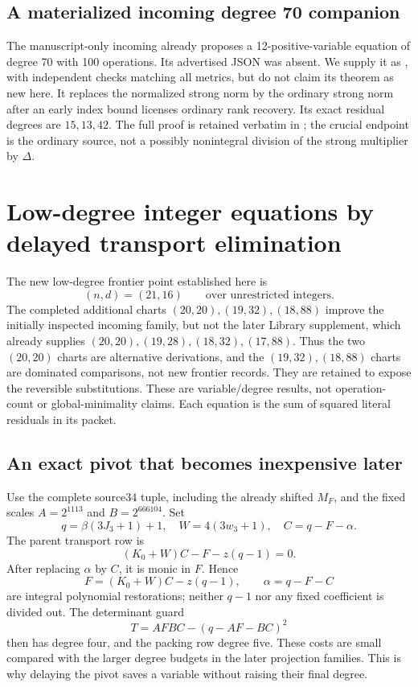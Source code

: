 \documentclass[11pt]{article}
\begin{document}
\subsection{A materialized incoming degree 70 companion}
The manuscript-only incoming  already proposes a
12-positive-variable equation of degree 70 with 100 operations.  Its advertised
JSON was absent.  We supply it as
, with independent checks matching
all metrics, but do not claim its theorem as new here.  It replaces the
normalized strong norm by the ordinary strong norm after an early index
bound licenses ordinary rank recovery.  Its exact residual degrees are
$15,13,42$.  The full proof is retained verbatim in
; the crucial endpoint
is the ordinary source, not a possibly nonintegral division of the strong
multiplier by $\Delta$.


\section{Low-degree integer equations by delayed transport elimination}
The new low-degree frontier point established here is
\[
 (n,d)=(21,16)\qquad\text{over unrestricted integers}.
\]
The completed additional charts $(20,20),(19,32),(18,88)$ improve the
initially inspected incoming family, but not the later Library supplement,
which already supplies $(20,20),(19,28),(18,32),(17,88)$.
Thus the two $(20,20)$ charts are alternative derivations, and the
$(19,32),(18,88)$ charts are dominated comparisons, not new frontier records.
They are retained to expose the reversible substitutions. These are
variable/degree results, not operation-count or global-minimality claims.
Each equation is the sum of squared literal residuals in its packet.

\subsection{An exact pivot that becomes inexpensive later}
Use the complete source34 tuple, including the already shifted $M_F$,
and the fixed scales $A=2^{1113}$ and $B=2^{666104}$. Set
\[
 q=\beta(3J_3+1)+1,\quad W=4(3w_3+1),\quad
 C=q-F-\alpha.
\]
The parent transport row is
\[
 (K_0+W)C-F-z(q-1)=0.
\]
After replacing $\alpha$ by $C$, it is monic in $F$. Hence
\[
 F=(K_0+W)C-z(q-1),\qquad \alpha=q-F-C
\]
are integral polynomial restorations; neither $q-1$ nor any fixed
coefficient is divided out. The determinant guard
\[
 T=AFBC-(q-AF-BC)^2
\]
then has degree four, and the packing row degree five. These costs are
small compared with the larger degree budgets in the later projection
families. This is why delaying the pivot saves a variable without
raising their final degree.
\end{document}
